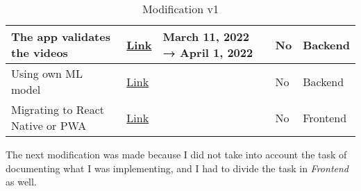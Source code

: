 \begin{table}[H]
{\begin{tabular}{|l|l|l|l|l|}
        \hline           The app validates the videos                   & \href{https://github.com/JesusGonzalezA/LearnASL/milestone/5}{Link}    &       March 11, 2022    → April 1, 2022          & No    & Backend   \\
        \hline           Using own ML model                             & \href{https://github.com/JesusGonzalezA/LearnASL/milestone/10}{Link}   &                                               & No    & Backend   \\
        \hline           Migrating to React Native or PWA               & \href{https://github.com/JesusGonzalezA/LearnASL/milestone/9}{Link}    &                                               & No    & Frontend  \\
        \hline
    \end{tabular}
    }
\caption{Modification v1}
\label{table:planification_real_v1}
\end{table}

The next modification was made because I did not take into account the task of documenting what I was implementing, and I had to divide the task in \textit{Frontend} as well. \\

